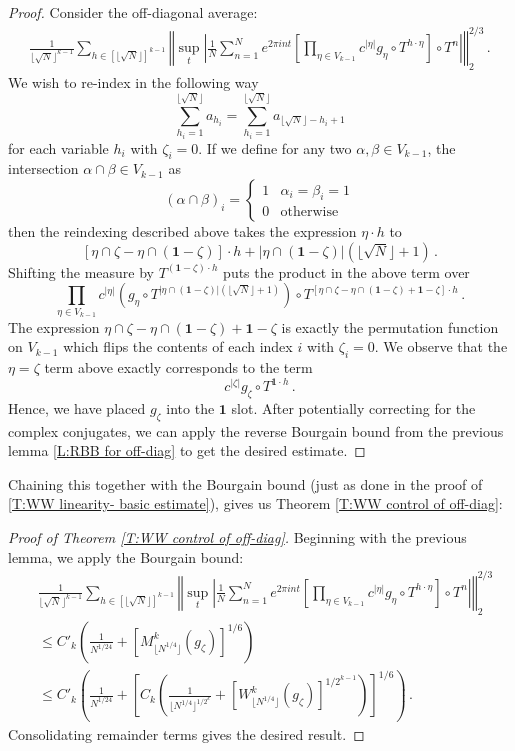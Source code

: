 \documentclass[11pt, oneside]{amsart}   	%
\newcommand{\1}{\mathbbm{1}}
\newcommand{\floor}[1]{\lfloor#1\rfloor}
\theoremstyle{definition}
\begin{document}
\begin{proof} Consider the off-diagonal average:
\begin{align*}
\frac{1}{\floor{\sqrt{N}}^{k-1}} \sum_{h \in [\floor{\sqrt{N}}]^{k-1}} \left\Vert\sup_t \left| \frac{1}{N} \sum_{n=1}^N e^{2\pi i n t} \left[ \prod_{\eta \in V_{k-1}} c^{|\eta|} g_\eta \circ T^{h \cdot \eta}\right] \circ T^n\right| \right\Vert_2^{2/3} \, .
\end{align*}
We wish to re-index in the following way
$$\sum_{h_i = 1}^{\floor{\sqrt{N}}} a_{h_i} = \sum_{h_i = 1}^{\floor{\sqrt{N}}} a_{\floor{\sqrt{N}} - h_i + 1}$$
for each variable $h_i$ with $\zeta_i = 0$.
If we define for any two $\alpha, \beta\in V_{k-1}$, the intersection $\alpha \cap \beta \in V_{k-1}$ as
$$(\alpha \cap \beta)_i = \begin{cases}
1 & \alpha_i = \beta_i = 1 \\ 0 &\text{otherwise}
\end{cases}$$
then the reindexing described above takes the expression $\eta\cdot h$ to
$$[\eta \cap \zeta - \eta \cap (\mathbf{1} - \zeta)] \cdot h + |\eta \cap (\mathbf{1} - \zeta)|(\floor{\sqrt{N}} + 1)\, .$$
Shifting the measure by $T^{(\mathbf{1} - \zeta) \cdot h}$ puts the product in the above term over
$$\prod_{\eta\in V_{k-1}} c^{|\eta|} \left(g_\eta \circ T^{|\eta \cap (\mathbf{1} - \zeta)|(\floor{\sqrt{N}} + 1)}\right) \circ T^{[\eta \cap \zeta - \eta \cap (\mathbf{1} - \zeta) + \mathbf{1} - \zeta] \cdot h }\, .$$
The expression $\eta \cap \zeta - \eta \cap (\mathbf{1} - \zeta) + \mathbf{1} - \zeta$ is exactly the permutation function on $V_{k-1}$ which flips the contents of each index $i$ with $\zeta_i = 0$. We observe that the $\eta = \zeta$ term above exactly corresponds to the term
$$c^{|\zeta|} g_\zeta \circ T^{\mathbf{1} \cdot h}\, . $$
Hence, we have placed $g_\zeta$ into the $\mathbf{1}$ slot. After potentially correcting for the complex conjugates, we can apply the reverse Bourgain bound from the previous lemma \ref{L:RBB for off-diag} to get the desired estimate.
\end{proof}
Chaining this together with the Bourgain bound (just as done in the proof of \ref{T:WW linearity- basic estimate}), gives us Theorem \ref{T:WW control of off-diag}:


\begin{proof}[Proof of Theorem \ref{T:WW control of off-diag}]
Beginning with the previous lemma, we apply the Bourgain bound:
\begin{align*}
&\frac{1}{\floor{\sqrt{N}}^{k-1}} \sum_{h \in [\floor{\sqrt{N}}]^{k-1}} \left\Vert\sup_t \left| \frac{1}{N} \sum_{n=1}^N e^{2\pi i n t} \left[ \prod_{\eta \in V_{k-1}} c^{|\eta|} g_\eta \circ T^{h \cdot \eta}\right] \circ T^n\right| \right\Vert_2^{2/3} \\ &\leq C'_k \left(\frac{1}{N^{1/24}} + \left[M_{\floor{N^{1/4}}}^k(g_\zeta)\right]^{1/6} \right) \\
&\leq C'_k \left(\frac{1}{N^{1/24}} + \left[C_k\left( \frac{1}{\floor{N^{1/4}}^{1/2^k}} + \left[W_{\floor{N^{1/4}}}^k (g_\zeta)\right]^{1/2^{k-1}} \right)\right]^{1/6} \right) \, .
\end{align*}
Consolidating remainder terms gives the desired result.
\end{proof}
\end{document}
